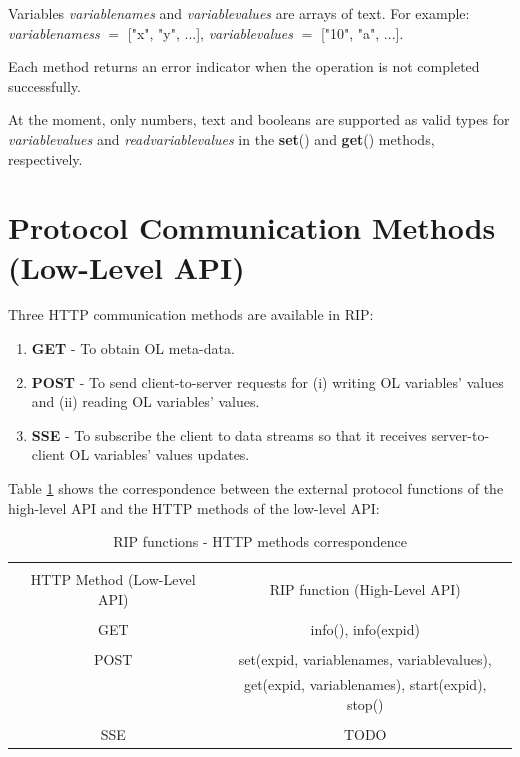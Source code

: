 Variables \textit{variablenames} and \textit{variablevalues} are arrays of text. For example: \textit{variablenamess} $=$ ["x", "y", ...], \textit{variablevalues} $=$ ["10", "a", ...].

Each method returns an error indicator when the operation is not completed successfully.

At the moment, only numbers, text and booleans are supported as valid types for \textit{variablevalues} and \textit{readvariablevalues} in the \textbf{set}() and \textbf{get}() methods, respectively.

\section{Protocol Communication Methods (Low-Level API)}
Three HTTP communication methods are available in RIP:

\begin{enumerate}
    \item \textbf{GET} - To obtain OL meta-data.
    \item \textbf{POST} - To send client-to-server requests for (i) writing OL variables' values and (ii) reading OL variables' values.
    \item \textbf{SSE} - To subscribe the client to data streams so that it receives server-to-client OL variables' values updates.
\end{enumerate}

Table \ref{tab:low-high-levels-correspondence} shows the correspondence between the external protocol functions of the high-level API and the HTTP methods of the low-level API:

\begin{table}[]
    \centering
    \begin{tabular}{|c|c|}\hline
         &  \\HTTP Method (Low-Level API) & RIP function (High-Level API)\\\hline
         &  \\GET & info(), info(expid) \\\hline
         &  \\POST & set(expid, variablenames, variablevalues),
            \\     & get(expid, variablenames), start(expid), stop() \\\hline
         &  \\SSE & TODO \\\hline
    \end{tabular}
    \caption{RIP functions - HTTP methods correspondence}
    \label{tab:low-high-levels-correspondence}
\end{table}


